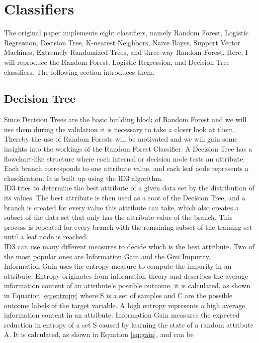 \section{Classifiers}
The original paper \cite{RN127} implements eight classifiers, namely Random 
Forest, 
Logistic Regression, Decision Tree, K-nearest Neighbors, Naive Bayes, Support 
Vector Machines, Extremely Randomized Trees, and three-way Random Forest. Here, 
I 
will reproduce the Random Forest, Logistic Regression, and Decision Tree 
classifiers. The 
following section introduces them.
\subsection{Decision Tree}
Since Decision Trees are the basic building block of Random Forest and we will 
use them during the validation it is necessary to take a closer look at them. 
Thereby the use of Random Forests will be motivated and we will gain some 
insights into the workings of the Random Forest Classifier.
A Decision Tree has a flowchart-like structure where each internal or decision 
node tests an attribute. Each branch corresponds to one attribute value, and 
each leaf node represents a classification. It is built up using the ID3 
algorithm.\cite{RN171}
\\
ID3 tries to determine the best attribute of a given data set by the 
distribution of its values. The best attribute is then used as a root of the 
Decision Tree, and a branch is created for every value this attribute can take, 
which also creates a subset of the data set that only has the attribute value 
of the branch. This process is repeated for every branch with the remaining 
subset of the training set until a leaf node is reached. \cite{RN165}
\\
ID3 can use many different measures to decide which is the best attribute. Two 
of the most popular ones are Information Gain and the Gini Impurity.
\\
Information Gain uses the entropy measure to compute the impurity in an 
attribute. Entropy originates from information theory and describes the average 
information content of an attribute's possible outcome, it is calculated, as 
shown in Equation \ref{eq:entropy} where S is a set of samples and C are the 
possible outcome labels of the target variable. A high entropy represents a 
high average 
information content in an attribute. Information Gain measures the expected 
reduction in entropy of a set S caused by learning the state of a random 
attribute A.  It is calculated, as shown in Equation \ref{eq:gain}, and can be 
